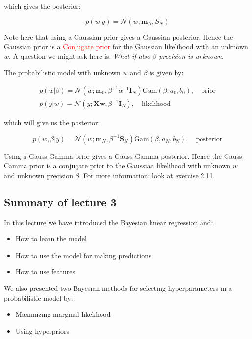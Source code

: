 which gives the posterior:

\begin{equation}
p(w|y)= \mathcal{N}(w;\bm{m}_N,S_N)
\end{equation}

Note here that using a Gaussian prior gives a Gaussian posterior. Hence the Gaussian prior is a \textcolor{red}{Conjugate prior} for the Gaussian likelihood with an unknown $w$. A question we might ask here is: \emph{What if also $\beta$ precision is unknown}.

The probabilistic model with unknown $w$ and $ \beta $ is given by:

\begin{equation}
\begin{aligned}
	p(w| \beta ) = \mathcal{N}(w; \bm{m}_0, \beta ^{-1} \alpha ^{-1} \bm{I}_N) \text{Gam} ( \beta; a_0, b_0), \quad \text{prior} \\
	p(y|w) = \mathcal{N}(y;\bm{Xw}, \beta ^{-1} \bm{I}_N), \quad \text{likelihood}
\end{aligned}
\end{equation}

which will give us the posterior:

\begin{equation}
	p(w, \beta |y)=\mathcal{N}(w;\bm{m}_N, \beta ^{-1}\bm{S}_N) \text{Gam}( \beta , a_N, b_N), \quad \text{posterior}
\end{equation}

Using a Gauss-Gamma prior gives a Gauss-Gamma posterior. Hence the Gauss-Camma prior is a conjugate prior to the Gaussian likelihood with unknown $w$ and unknown precision $ \beta $. For more information: look at exercise 2.11.

\subsection{Summary of lecture 3}
In this lecture we have introduced the Bayesian linear regression and:
\begin{itemize}
	\item How to learn the model
	\item How to use the model for making predictions
	\item How to use features
\end{itemize}

We also presented two Bayesian methods for selecting hyperparameters in a probabilistic model by:
\begin{itemize}
	\item Maximizing marginal likelihood
	\item Using hyperpriors
\end{itemize}









